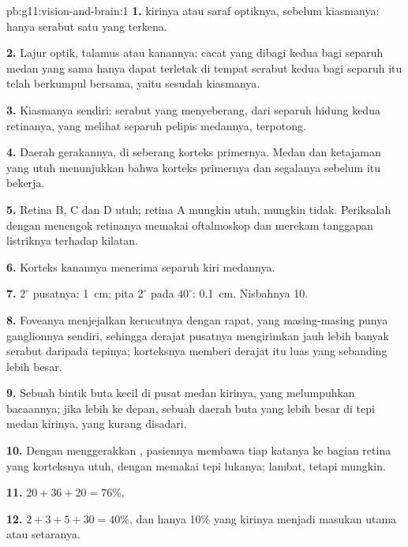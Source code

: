 \begin{solution}{pb:g11:vision-and-brain:1}
\textbf{1.}  kirinya atau saraf optiknya, sebelum kiasmanya: hanya
serabut satu  yang terkena.

\textbf{2.} Lajur optik, talamus atau  kanannya:
cacat yang dibagi kedua  bagi separuh medan yang sama hanya
dapat terletak di tempat serabut kedua  bagi separuh itu telah
berkumpul bersama, yaitu sesudah kiasmanya.

\textbf{3.} Kiasmanya sendiri: serabut yang menyeberang, dari separuh
hidung kedua retinanya, yang melihat separuh pelipis medannya,
terpotong.

\textbf{4.} Daerah gerakannya, di seberang korteks primernya. Medan dan
ketajaman yang utuh menunjukkan bahwa korteks primernya dan segalanya
sebelum itu bekerja.

\textbf{5.} Retina B, C dan D utuh; retina A mungkin utuh, mungkin
tidak. Periksalah dengan menengok retinanya memakai oftalmoskop dan
merekam tanggapan listriknya terhadap kilatan.

\textbf{6.} Korteks kanannya menerima separuh kiri medannya.

\textbf{7.} $2^\circ$ pusatnya: \qty{1}{cm}; pita $2^\circ$ pada
$40^\circ$: \qty{0.1}{cm}. Nisbahnya 10.

\textbf{8.} Foveanya menjejalkan kerucutnya dengan rapat, yang
masing-masing punya  ganglionnya sendiri, sehingga derajat pusatnya
mengirimkan jauh lebih banyak serabut daripada tepinya; korteksnya
memberi derajat itu luas yang sebanding lebih besar.

\textbf{9.} Sebuah bintik buta kecil di pusat medan kirinya, yang
melumpuhkan bacaannya; jika lebih ke depan, sebuah daerah buta yang
lebih besar di tepi medan kirinya, yang kurang disadari.

\textbf{10.} Dengan menggerakkan , pasiennya membawa tiap
katanya ke bagian retina yang korteksnya utuh, dengan memakai tepi
lukanya; lambat, tetapi mungkin.

\textbf{11.} $20 + 36 + 20 = 76\%$.

\textbf{12.} $2 + 3 + 5 + 30 = 40\%$, dan hanya 10\% yang  kirinya
menjadi masukan utama atau setaranya.


\end{solution}

